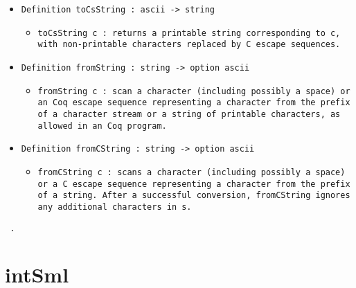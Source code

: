 \documentclass[11pt]{report}
\begin{document}
\begin{itemize}
\item  \texttt{Definition toCsString : ascii -> string}

\begin{itemize}
\item  \begin{flushleft} \texttt{toCsString c : returns a printable string corresponding to c, with non-printable characters replaced by C escape sequences.} \end{flushleft}
\end{itemize}

\item \texttt{Definition fromString : string -> option ascii}

\begin{itemize}
\item  \begin{flushleft} \texttt{fromString c : scan a character (including possibly a space) or an Coq escape sequence representing a character from the prefix of a character stream or a string of printable characters, as allowed in an Coq program.} \end{flushleft}
\end{itemize}

\item \texttt{Definition fromCString : string -> option ascii}

\begin{itemize}
\item  \begin{flushleft} \texttt{fromCString c : scans a character (including possibly a space) or a C escape sequence representing a character from the prefix of a string. After a successful conversion, fromCString ignores any additional characters in s.} \end{flushleft}
\end{itemize}

\end{itemize}






\begin{coqdoccode}
\coqdocemptyline
\coqdocemptyline
\coqdocnoindent
\texttt{ .\coqdoceol}
\coqdocemptyline
\end{coqdoccode}
\section*{intSml}
\end{document}
